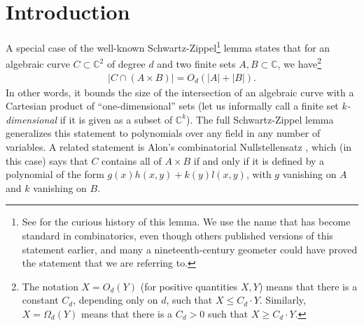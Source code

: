 \documentclass{daj}
\theoremstyle{definition}
\newcommand{\C}{\mathbb C}
\begin{document}

\section{Introduction}
\label{sec:intro}

A special case of the well-known Schwartz-Zippel\footnote{See \cite{L} for the curious history of this lemma. 
We use the name that has become standard in combinatorics, even though others published versions of this statement earlier, and many a nineteenth-century geometer could have proved the statement that we are referring to.}
lemma 
states that for an algebraic curve $C\subset \C^2$ of degree $d$ and two finite sets $A,B\subset \C$, we have\footnote{The notation $X=O_d(Y)$ (for positive quantities $X,Y$) means that there is a constant $C_d$, depending only on $d$, such that $X\leq C_d\cdot Y$. 
Similarly, $X =\Omega_d(Y)$ means that there is a $C_d>0$ such that $X\geq C_d\cdot Y$.}
\begin{align}\label{eq:schwartzzippel}
|C\cap (A\times B)|=O_d(|A|+|B|).
\end{align}
In other words, it bounds the size of the intersection of an algebraic curve with a Cartesian product of ``one-dimensional'' sets (let us informally call a finite set \emph{$k$-dimensional} if it is given as a subset of $\C^k$).
The full Schwartz-Zippel lemma generalizes this statement to polynomials over any field in any number of variables.
A related statement is Alon's combinatorial Nullstellensatz \cite{A}, which (in this case) says that $C$ contains all of  $A\times B$ if and only if it is defined by a polynomial of the form $g(x)h(x,y) + k(y)l(x,y)$, with $g$ vanishing on $A$ and $k$ vanishing on $B$.
\end{document}
